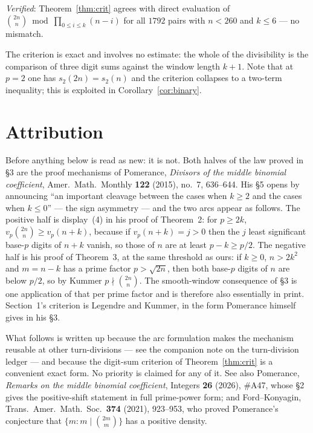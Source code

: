\documentclass[11pt]{article}
\begin{document}
\emph{Verified}: Theorem~\ref{thm:crit} agrees with direct evaluation of
$\binom{2n}{n}\bmod\prod_{0\le i\le k}(n-i)$ for all $1792$ pairs with $n<260$ and
$k\le6$ --- no mismatch.

The criterion is exact and involves no estimate: the whole of the divisibility is the
comparison of three digit sums against the window length $k+1$.  Note that at $p=2$ one has
$s_2(2n)=s_2(n)$ and the criterion collapses to a two-term inequality; this is exploited in
Corollary~\ref{cor:binary}.

\section{Attribution}

Before anything below is read as new: it is not.  Both halves of the law proved in \S3 are the
proof mechanisms of Pomerance, \emph{Divisors of the middle binomial coefficient}, Amer.\ Math.\
Monthly \textbf{122} (2015), no.~7, 636--644.  His \S5 opens by announcing ``an important
cleavage between the cases when $k\ge2$ and the cases when $k\le0$'' --- the sign asymmetry ---
and the two arcs appear as follows.  The positive half is display~(4) in his proof of Theorem~2:
for $p\ge2k$, $v_p\binom{2n}{n}\ge v_p(n+k)$, because if $v_p(n+k)=j>0$ then the $j$ least
significant base-$p$ digits of $n+k$ vanish, so those of $n$ are at least $p-k\ge p/2$.  The
negative half is his proof of Theorem~3, at the same threshold as ours: if $k\ge0$, $n>2k^{2}$
and $m=n-k$ has a prime factor $p>\sqrt{2n}$, then both base-$p$ digits of $n$ are below $p/2$,
so by Kummer $p\nmid\binom{2n}{n}$.  The smooth-window consequence of \S3 is one application of
that per prime factor and is therefore also essentially in print.  Section~1's criterion is
Legendre and Kummer, in the form Pomerance himself gives in his \S3.

What follows is written up because the arc formulation makes the mechanism reusable at other
turn-divisions --- see the companion note on the turn-division ledger --- and because the
digit-sum criterion of Theorem~\ref{thm:crit} is a convenient exact form.  No priority is
claimed for any of it.  See also Pomerance, \emph{Remarks on the middle binomial coefficient},
Integers \textbf{26} (2026), \#A47, whose \S2 gives the positive-shift statement in full
prime-power form; and Ford--Konyagin, Trans.\ Amer.\ Math.\ Soc.\ \textbf{374} (2021), 923--953,
who proved Pomerance's conjecture that $\{m:m\mid\binom{2m}{m}\}$ has a positive density.
\end{document}
